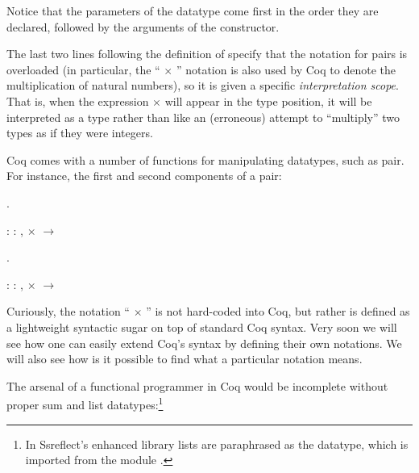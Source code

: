 \coqdocemptyline


Notice that the parameters of the datatype come first in the order
they are declared, followed by the arguments of the constructor.


The last two lines following the definition of  specify that the
notation for pairs is overloaded (in particular, the ``\coqdocvar{\_} \ensuremath{\times} \coqdocvar{\_}''
notation is also used by Coq to denote the multiplication of natural
numbers), so it is given a specific \textit{interpretation scope}. That is,
when the expression  \ensuremath{\times}  will appear in the type position, it
will be interpreted as a type    rather than like an
(erroneous) attempt to ``multiply'' two types as if they were integers.


Coq comes with a number of functions for manipulating datatypes, such
as pair. For instance, the first and second components of a pair:
\begin{coqdoccode}
\coqdocemptyline
\coqdocnoindent
{} .\coqdoceol
\end{coqdoccode}
\coqdoceol
\coqdocemptyline
\coqdocnoindent
{} : \coqdockw{\ensuremath{\forall}}   : ,  \ensuremath{\times}  \ensuremath{\rightarrow} 

\coqdocemptyline
\begin{coqdoccode}
\coqdocemptyline
\coqdocnoindent
{} .\coqdoceol
\end{coqdoccode}
\coqdoceol
\coqdocemptyline
\coqdocnoindent
{} : \coqdockw{\ensuremath{\forall}}   : ,  \ensuremath{\times}  \ensuremath{\rightarrow} 

\coqdocemptyline


Curiously, the notation ``\coqdocvar{\_} \ensuremath{\times} \coqdocvar{\_}'' is not hard-coded into Coq, but
rather is defined as a lightweight syntactic sugar on top of standard
Coq syntax. Very soon we will see how one can easily extend Coq's
syntax by defining their own notations. We will also see how is it
possible to find what a particular notation means.


The arsenal of a functional programmer in Coq would be incomplete
without proper sum and list datatypes:\footnote{In Ssreflect's
enhanced library lists are paraphrased as the   datatype, which
is imported from the module .} 


